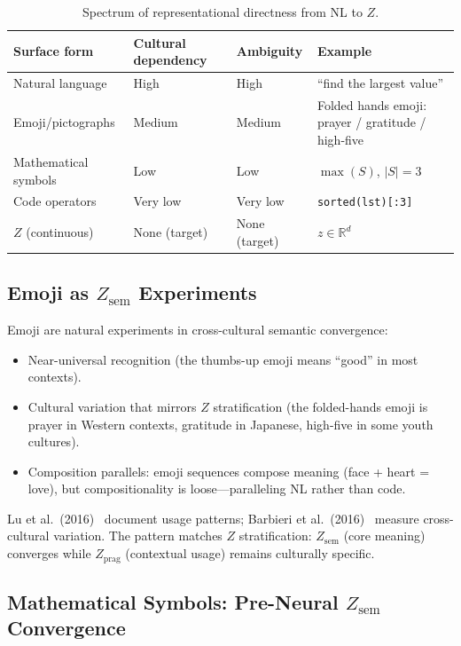 \documentclass{article}
\theoremstyle{definition}
\newcommand{\Zsem}{Z_{\text{sem}}}
\newcommand{\Zprag}{Z_{\text{prag}}}
\begin{document}
\begin{table}[h]
\centering
\caption{Spectrum of representational directness from NL to $Z$.}
\label{tab:spectrum}
\small
\begin{tabularx}{\textwidth}{l l l L}
\toprule
\textbf{Surface form} & \textbf{Cultural dependency} & \textbf{Ambiguity} & \textbf{Example} \\
\midrule
Natural language & High & High & ``find the largest value'' \\
Emoji/pictographs & Medium & Medium & Folded hands emoji: prayer / gratitude / high-five \\
Mathematical symbols & Low & Low & $\max(S)$, $|S| = 3$ \\
Code operators & Very low & Very low & \texttt{sorted(lst)[:3]} \\
$Z$ (continuous) & None (target) & None (target) & $z \in \mathbb{R}^d$ \\
\bottomrule
\end{tabularx}
\end{table}

\subsection{Emoji as $\Zsem$ Experiments}

Emoji are natural experiments in cross-cultural semantic convergence:
\begin{itemize}[nosep]
  \item Near-universal recognition (the thumbs-up emoji means ``good'' in most contexts).
  \item Cultural variation that mirrors $Z$ stratification (the folded-hands emoji is prayer in Western contexts, gratitude in Japanese, high-five in some youth cultures).
  \item Composition parallels: emoji sequences compose meaning (face + heart = love), but compositionality is loose---paralleling NL rather than code.
\end{itemize}

Lu et al.\ (2016)~\citep{lu2016emoji} document usage patterns; Barbieri et al.\ (2016)~\citep{barbieri2016emoji} measure cross-cultural variation. The pattern matches $Z$ stratification: $\Zsem$ (core meaning) converges while $\Zprag$ (contextual usage) remains culturally specific.

\subsection{Mathematical Symbols: Pre-Neural $\Zsem$ Convergence}
\end{document}
